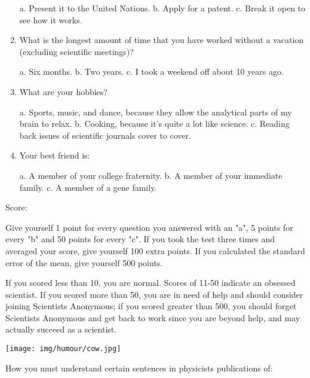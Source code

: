 \begin{enumerate}
a. Present it to the United Nations.
b.	Apply for a patent.
c. Break it open to see how it works.

	\item What is the longest amount of time that you have worked without a vacation (excluding scientific meetings)? 

a.	Six months.
b.	Two years.
c. I took a weekend off about 10 years ago.

	\item What are your hobbies? 

a. Sports, music, and dance, because they allow the analytical parts of my brain to relax. 
b. Cooking, because it's quite a lot like science.
c. Reading back issues of scientific journals cover to cover. 

	\item Your best friend is: 

a. A member of your college fraternity.
b. A member of your immediate family.
c. A member of a gene family. 
\end{enumerate}

Score:

Give yourself 1 point for every question you answered with an "a", 5 points for every "b" and 50 points for every "c". If you took the test three times and averaged your score, give yourself 100 extra points. If you calculated the standard error of the mean, give yourself 500 points. 

If you scored less than 10, you are normal. Scores of 11-50 indicate an obsessed scientist. If you scored more than 50, you are in need of help and should consider joining Scientists Anonymous; if you scored greater than 500, you should forget Scientists Anonymous and get back to work since you are beyond help, and may actually succeed as a scientist.
\begin{center}\underline{\hspace{5 cm}}\end{center}

	\begin{center}
	\texttt{[image: img/humour/cow.jpg]}
	\end{center}
	
\pagebreak

How you must understand certain sentences in physicists publications of:

